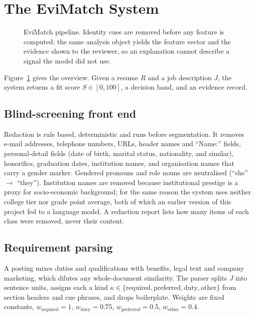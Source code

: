 \section{The EviMatch System}\label{sec:method}
\begin{figure}[t]
\centering

\caption{EviMatch pipeline. Identity cues are removed before any feature is computed; the same
analysis object yields the feature vector and the evidence shown to the reviewer, so an explanation
cannot describe a signal the model did not use.}
\label{fig:arch}
\end{figure}

Figure~\ref{fig:arch} gives the overview. Given a resume $R$ and a job description $J$, the system
returns a fit score $S\in[0,100]$, a decision band, and an evidence record.

\subsection{Blind-screening front end}
Redaction is rule based, deterministic and runs before segmentation. It removes e-mail addresses,
telephone numbers, URLs, header names and ``Name:'' fields, personal-detail fields (date of birth,
marital status, nationality, and similar), honorifics, graduation dates, institution names, and
organisation names that carry a gender marker. Gendered pronouns and role nouns are neutralised
(``she'' $\to$ ``they''). Institution names are removed because institutional prestige is a proxy
for socio-economic background; for the same reason the system uses neither college tier nor grade
point average, both of which an earlier version of this project fed to a language model. A redaction
report lists how many items of each class were removed, never their content.

\subsection{Requirement parsing}
A posting mixes duties and qualifications with benefits, legal text and company marketing, which
dilutes any whole-document similarity. The parser splits $J$ into sentence units, assigns each a kind
$\kappa\in\{\text{required},\text{preferred},\text{duty},\text{other}\}$ from section headers and cue
phrases, and drops boilerplate. Weights are fixed constants,
$w_{\text{required}}{=}1$, $w_{\text{duty}}{=}0.75$, $w_{\text{preferred}}{=}0.5$, $w_{\text{other}}{=}0.4$.

